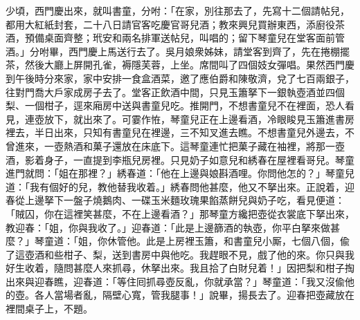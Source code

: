 少頃，西門慶出來，就叫書童，分咐：「在家，別往那去了，先寫十二個請帖兒，都用大紅紙封套，二十八日請官客吃慶官哥兒酒；教來興兒買辦東西，添廚役茶酒，預備桌面齊整；玳安和兩名排軍送帖兒，叫唱的；留下琴童兒在堂客面前管酒。」分咐畢，西門慶上馬送行去了。吳月娘衆姊妹，請堂客到齊了，先在捲棚擺茶，然後大廳上屏開孔雀，褥隱芙蓉，上坐。席間叫了四個妓女彈唱。果然西門慶到午後時分來家，家中安排一食盒酒菜，邀了應伯爵和陳敬濟，兌了七百兩銀子，往對門喬大戶家成房子去了。堂客正飲酒中間，只見玉簫拏下一銀執壺酒並四個梨、一個柑子，逕來廂房中送與書童兒吃。推開門，不想書童兒不在裡面，恐人看見，連壺放下，就出來了。可霎作恠，琴童兒正在上邊看酒，冷眼睃見玉簫進書房裡去，半日出來，只知有書童兒在裡邊，三不知叉進去瞧。不想書童兒外邊去，不曾進來，一壺熱酒和菓子還放在床底下。這琴童連忙把菓子藏在袖裡，將那一壺酒，影着身子，一直提到李瓶兒房裡。只見奶子如意兒和綉春在屋裡看哥兒。琴童進門就問：「姐在那裡？」綉春道：「他在上邊與娘斟酒哩。你問他怎的？」琴童兒道：「我有個好的兒，教他替我收着。」綉春問他甚麼，他又不拏出來。正說着，迎春從上邊拏下一盤子燒鵝肉、一碟玉米麵玫瑰果餡蒸餅兒與奶子吃，看見便道：「賊囚，你在這裡笑甚麼，不在上邊看酒？」那琴童方纔把壺從衣裳底下拏出來，教迎春：「姐，你與我收了。」迎春道：「此是上邊篩酒的執壺，你平白拏來做甚麼？」琴童道：「姐，你休管他。此是上房裡玉簫，和書童兒小厮，七個八個，偸了這壺酒和些柑子、梨，送到書房中與他吃。我趕眼不見，戲了他的來。你只與我好生收着，隨問甚麼人來抓尋，休拏出來。我且拾了白財兒着！」因把梨和柑子掏出來與迎春瞧，迎春道：「等住囘抓尋壺反亂，你就承當？」琴童道：「我又沒偸他的壺。各人當場者亂，隔壁心寬，管我腿事！」說畢，揚長去了。迎春把壺藏放在裡間桌子上，不題。

